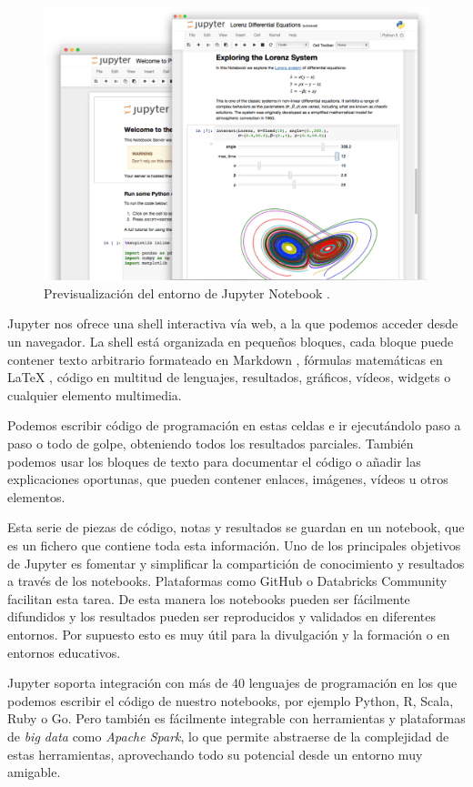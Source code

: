 \begin{figure}[htp!]
	\centering
	\caption{Previsualización del entorno de Jupyter Notebook \cite{jupyter}.}
	\label{jupyterPreview}
	\vspace{5pt}
	\includegraphics[scale=0.45]{graphics/jupyterpreview}
\end{figure}

Jupyter nos ofrece una shell interactiva vía web, a la que podemos acceder desde un navegador. La shell está organizada en pequeños bloques, cada bloque puede contener texto arbitrario formateado en Markdown \cite{markdown}, fórmulas matemáticas en LaTeX \cite{latex}, código en multitud de lenguajes, resultados, gráficos, vídeos, widgets o cualquier elemento multimedia.

Podemos escribir código de programación en estas celdas e ir ejecutándolo paso a paso o todo de golpe, obteniendo todos los resultados parciales. También podemos usar los bloques de texto para documentar el código o añadir las explicaciones oportunas, que pueden contener enlaces, imágenes, vídeos u otros elementos.

Esta serie de piezas de código, notas y resultados se guardan en un notebook, que es un fichero que contiene toda esta información. Uno de los principales objetivos de Jupyter es fomentar y simplificar la compartición de conocimiento y resultados a través de los notebooks. Plataformas como GitHub \cite{github} o Databricks Community \cite{databricks} facilitan esta tarea. De esta manera los notebooks pueden ser fácilmente difundidos y los resultados pueden ser reproducidos y validados en diferentes entornos. Por supuesto esto es muy útil para la divulgación y la formación o en entornos educativos.

Jupyter soporta integración con más de 40 lenguajes de programación en los que podemos escribir el código de nuestro notebooks, por ejemplo Python, R, Scala, Ruby o Go. Pero también es fácilmente integrable con herramientas y plataformas de \textit{big data} como \textit{Apache Spark}, lo que permite abstraerse de la complejidad de estas herramientas, aprovechando todo su potencial desde un entorno muy amigable.
